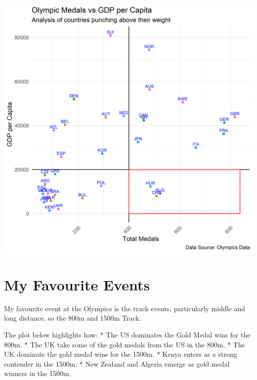 \documentclass[11pt,preprint, authoryear]{elsarticle}
\let\origfigure\figure
\let\endorigfigure\endfigure
\renewenvironment{figure}[1][2] {
    \expandafter\origfigure\expandafter[H]
} {
    \endorigfigure
}
\numberwithin{equation}{section}
\numberwithin{figure}{section}
\numberwithin{table}{section}
\begin{document}
\begin{figure}[H]

{\centering \includegraphics{Question_4_files/figure-latex/Figure4-1} 

}

\caption{Punching above Economy Size \label{Figure4}}\label{fig:Figure4}
\end{figure}

\hypertarget{my-favourite-events}{%
\section{\texorpdfstring{My Favourite Events
\label{my_events}}{My Favourite Events }}\label{my-favourite-events}}

My favourite event at the Olympics is the track events, particularly
middle and long distance, so the 800m and 1500m Track.

The plot below highlights how: * The US dominates the Gold Medal wins
for the 800m. * The UK take some of the gold medals from the US in the
800m. * The UK dominate the gold medal wins for the 1500m. * Kenya
enters as a strong contender in the 1500m. * New Zealand and Algeria
emerge as gold medal winners in the 1500m.
\end{document}
